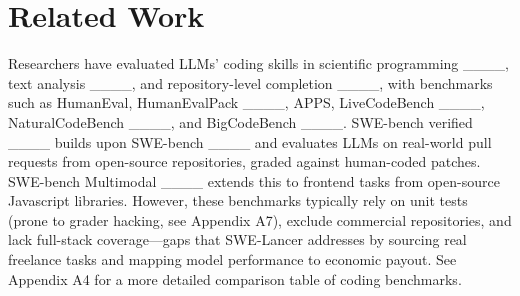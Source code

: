 \section{Related Work}
Researchers have evaluated LLMs’ coding skills in scientific programming ____, text analysis ____, and repository-level completion ____, with benchmarks such as HumanEval, HumanEvalPack ____, APPS, LiveCodeBench ____, NaturalCodeBench ____, and BigCodeBench ____. SWE-bench verified ____ builds upon SWE-bench ____ and evaluates LLMs on real-world pull requests from open-source repositories, graded against human-coded patches. SWE-bench Multimodal ____ extends this to frontend tasks from open-source Javascript libraries. However, these benchmarks typically rely on unit tests (prone to grader hacking, see Appendix A7), exclude commercial repositories, and lack full-stack coverage—gaps that SWE-Lancer addresses by sourcing real freelance tasks and mapping model performance to economic payout. See Appendix A4 for a more detailed comparison table of coding benchmarks.